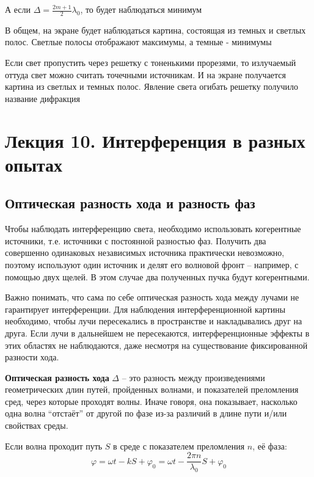 \documentclass[12pt]{article}
\begin{document}
А если $\Delta = \frac{2m + 1}{2} \lambda_0$, то будет наблюдаться минимум

В общем, на экране будет наблюдаться картина, состоящая из темных и светлых полос. Светлые полосы отображают
максимумы, а темные - минимумы

Если свет пропустить через решетку с тоненькими прорезями, то излучаемый оттуда свет можно считать точечными источникам.
И на экране получается картина из светлых и темных полос. Явление света огибать решетку получило название дифракция








\section{Лекция 10. Интерференция в разных опытах}

\subsection{Оптическая разность хода и разность фаз}

Чтобы наблюдать интерференцию света, необходимо использовать когерентные источники, т.е. источники с постоянной разностью фаз. Получить два совершенно одинаковых независимых источника практически невозможно, поэтому используют один источник и делят его волновой фронт -- например, с помощью двух щелей. В этом случае два полученных пучка будут когерентными.

Важно понимать, что сама по себе оптическая разность хода между лучами не гарантирует интерференции. Для наблюдения интерференционной картины необходимо, чтобы лучи пересекались в пространстве и накладывались друг на друга. Если лучи в дальнейшем не пересекаются, интерференционные эффекты в этих областях не наблюдаются, даже несмотря на существование фиксированной разности хода.

\textbf{Оптическая разность хода} $\Delta$ -- это разность между произведениями геометрических длин путей, пройденных волнами, и показателей преломления сред, через которые проходят волны. Иначе говоря, она показывает, насколько одна волна \enquote{отстаёт} от другой по фазе из-за различий в длине пути и/или свойствах среды.

Если волна проходит путь $S$ в среде с показателем преломления $n$, её фаза:
\[
\varphi = \omega t - k S + \varphi_0 = \omega t - \frac{2\pi n}{\lambda_0} S + \varphi_0
\]
\end{document}
